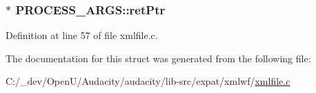 \subsubsection[{\texorpdfstring{ret\+Ptr}{retPtr}}]{$\ast$ P\+R\+O\+C\+E\+S\+S\+\_\+\+A\+R\+G\+S\+::ret\+Ptr}\hypertarget{struct_p_r_o_c_e_s_s___a_r_g_s_a47fc3d5e09769e957a91f3ff72accba2}{}\label{struct_p_r_o_c_e_s_s___a_r_g_s_a47fc3d5e09769e957a91f3ff72accba2}


Definition at line 57 of file xmlfile.\+c.



The documentation for this struct was generated from the following file\+:\begin{DoxyCompactItemize}
\item 
C\+:/\+\_\+dev/\+Open\+U/\+Audacity/audacity/lib-\/src/expat/xmlwf/\hyperlink{xmlfile_8c}{xmlfile.\+c}\end{DoxyCompactItemize}
